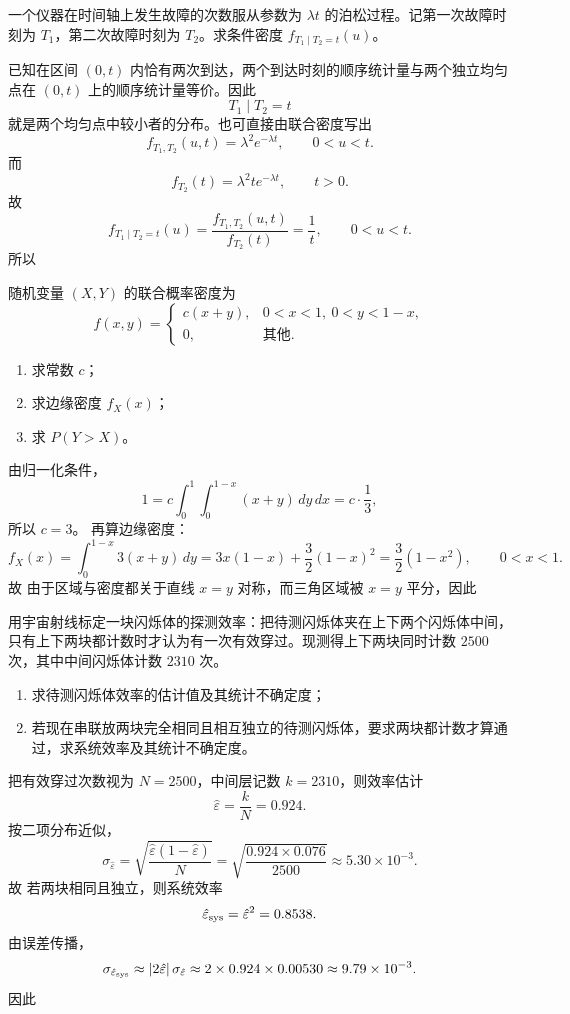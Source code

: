 \begin{question}
一个仪器在时间轴上发生故障的次数服从参数为 $\lambda t$ 的泊松过程。记第一次故障时刻为 $T_1$，第二次故障时刻为 $T_2$。求条件密度 $f_{T_1\mid T_2=t}(u)$。
\begin{solution}
已知在区间 $(0,t)$ 内恰有两次到达，两个到达时刻的顺序统计量与两个独立均匀点在 $(0,t)$ 上的顺序统计量等价。因此
\[
T_1\mid T_2=t
\]
就是两个均匀点中较小者的分布。也可直接由联合密度写出
\[
f_{T_1,T_2}(u,t)=\lambda^2 e^{-\lambda t},\qquad 0<u<t.
\]
而
\[
f_{T_2}(t)=\lambda^2 t e^{-\lambda t},\qquad t>0.
\]
故
\[
f_{T_1\mid T_2=t}(u)=\frac{f_{T_1,T_2}(u,t)}{f_{T_2}(t)}
=\frac{1}{t},\qquad 0<u<t.
\]
所以
\end{solution}
\end{question}

\begin{question}
随机变量 $(X,Y)$ 的联合概率密度为
\[
f(x,y)=\begin{cases}
c(x+y),&0<x<1,\ 0<y<1-x,\\
0,&\text{其他}.
\end{cases}
\]
\begin{enumerate}
\item 求常数 $c$；
\item 求边缘密度 $f_X(x)$；
\item 求 $P(Y>X)$。
\end{enumerate}
\begin{solution}
由归一化条件，
\[
1=c\int_0^1\int_0^{1-x}(x+y)\,dy\,dx
=c\cdot \frac13,
\]
所以 $c=3$。
再算边缘密度：
\[
f_X(x)=\int_0^{1-x}3(x+y)\,dy
=3x(1-x)+\frac32(1-x)^2
=\frac32(1-x^2),\qquad 0<x<1.
\]
故
由于区域与密度都关于直线 $x=y$ 对称，而三角区域被 $x=y$ 平分，因此
\end{solution}
\end{question}

\begin{question}
用宇宙射线标定一块闪烁体的探测效率：把待测闪烁体夹在上下两个闪烁体中间，只有上下两块都计数时才认为有一次有效穿过。现测得上下两块同时计数 $2500$ 次，其中中间闪烁体计数 $2310$ 次。
\begin{enumerate}
\item 求待测闪烁体效率的估计值及其统计不确定度；
\item 若现在串联放两块完全相同且相互独立的待测闪烁体，要求两块都计数才算通过，求系统效率及其统计不确定度。
\end{enumerate}
\begin{solution}
把有效穿过次数视为 $N=2500$，中间层记数 $k=2310$，则效率估计
\[
\hat\varepsilon=\frac{k}{N}=0.924.
\]
按二项分布近似，
\[
\sigma_{\hat\varepsilon}
=\sqrt{\frac{\hat\varepsilon(1-\hat\varepsilon)}{N}}
=\sqrt{\frac{0.924\times 0.076}{2500}}
\approx 5.30\times 10^{-3}.
\]
故
若两块相同且独立，则系统效率
\[
\hat\varepsilon_{\rm sys}=\hat\varepsilon^2=0.8538.
\]
由误差传播，
\[
\sigma_{\hat\varepsilon_{\rm sys}}
\approx \left|2\hat\varepsilon\right|\sigma_{\hat\varepsilon}
\approx 2\times 0.924\times 0.00530
\approx 9.79\times 10^{-3}.
\]
因此
\end{solution}
\end{question}

